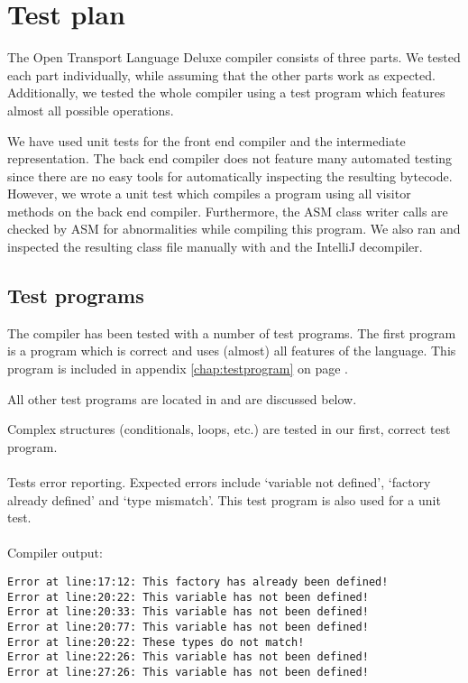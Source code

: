 \chapter{Test plan}

The Open Transport Language Deluxe compiler consists of three parts.
We tested each part individually, while assuming that the other parts work as expected.
Additionally, we tested the whole compiler using a test program which features almost all possible operations.

We have used unit tests for the front end compiler and the intermediate representation.
The back end compiler does not feature many automated testing since there are no easy tools for automatically inspecting the resulting bytecode.
However, we wrote a unit test which compiles a program using all visitor methods on the back end compiler.
Furthermore, the ASM class writer calls are checked by ASM for abnormalities while compiling this program.
We also ran and inspected the resulting class file manually with  and the IntelliJ decompiler.

\section{Test programs}

The compiler has been tested with a number of test programs. The first program is a program which is correct and uses (almost) all features of the language. This program is included in appendix \ref{chap:testprogram} on page \pageref{chap:testprogram}.

All other test programs are located in  and are discussed below.

Complex structures (conditionals, loops, etc.) are tested in our first, correct test program.

\subsubsection*{}
Tests error reporting. Expected errors include `variable not defined', `factory already defined' and `type mismatch'. This test program is also used for a unit test. \\
\\
Compiler output:
\begin{lstlisting}
Error at line:17:12: This factory has already been defined!
Error at line:20:22: This variable has not been defined!
Error at line:20:33: This variable has not been defined!
Error at line:20:77: This variable has not been defined!
Error at line:20:22: These types do not match!
Error at line:22:26: This variable has not been defined!
Error at line:27:26: This variable has not been defined!
\end{lstlisting}

